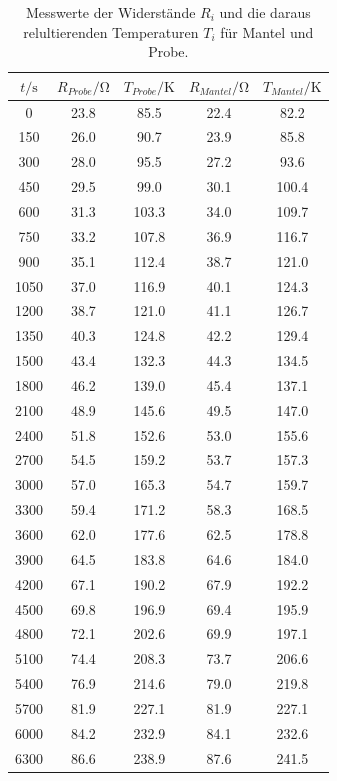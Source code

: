 \begin{table}  %
  \centering
  \caption{Messwerte der Widerstände $R_i$ und die daraus relultierenden Temperaturen $T_i$ für Mantel und Probe.}
  \label{tab:Messwerte}
  \begin{tabular}{c c c c c}
  \toprule
  $t/\si{\second}$ & $R_{Probe}/\si{\ohm}$ & $T_{Probe}/\si{\kelvin}$ & $R_{Mantel}/\si{\ohm}$ & $T_{Mantel}/\si{\kelvin}$\\
  \midrule
  0	&	23.8	&	85.5	&	22.4	&	82.2   \\
  150	&	26.0	&	90.7	&	23.9	&	85.8   \\
  300	&	28.0	&	95.5	&	27.2	&	93.6   \\
  450	&	29.5	&	99.0	&	30.1	&	100.4   \\
  600	&	31.3	&	103.3	&	34.0	&	109.7   \\
  750	&	33.2	&	107.8	&	36.9	&	116.7   \\
  900	&	35.1	&	112.4	&	38.7	&	121.0   \\
  1050	&	37.0	&	116.9	&	40.1	&	124.3   \\
  1200	&	38.7	&	121.0	&	41.1	&	126.7   \\
  1350	&	40.3	&	124.8	&	42.2	&	129.4   \\
  1500	&	43.4	&	132.3	&	44.3	&	134.5   \\
  1800	&	46.2	&	139.0	&	45.4	&	137.1   \\
  2100	&	48.9	&	145.6	&	49.5	&	147.0   \\
  2400	&	51.8	&	152.6	&	53.0	&	155.6   \\
  2700	&	54.5	&	159.2	&	53.7	&	157.3   \\
  3000	&	57.0	&	165.3	&	54.7	&	159.7   \\
  3300	&	59.4	&	171.2	&	58.3	&	168.5   \\
  3600	&	62.0	&	177.6	&	62.5	&	178.8   \\
  3900	&	64.5	&	183.8	&	64.6	&	184.0   \\
  4200	&	67.1	&	190.2	&	67.9	&	192.2   \\
  4500	&	69.8	&	196.9	&	69.4	&	195.9   \\
  4800	&	72.1	&	202.6	&	69.9	&	197.1   \\
  5100	&	74.4	&	208.3	&	73.7	&	206.6   \\
  5400	&	76.9	&	214.6	&	79.0	&	219.8   \\
  5700	&	81.9	&	227.1	&	81.9	&	227.1   \\
  6000	&	84.2	&	232.9	&	84.1	&	232.6   \\
  6300	&	86.6	&	238.9	&	87.6	&	241.5   \\

\end{tabular}
\end{table}
